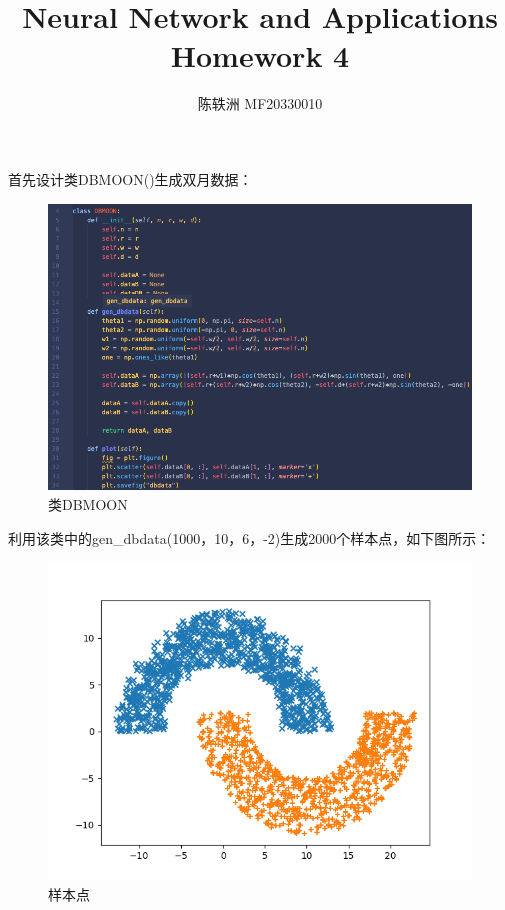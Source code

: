 \documentclass{article}
\title{Neural Network and Applications\\Homework 4}
\author{陈轶洲 MF20330010}
\begin{document}
	\maketitle
	
\section{}
首先设计类DBMOON()生成双月数据：
\begin{figure}[H]
	\centering
	\includegraphics[scale=0.5]{dbmoon.png}
	\caption{类DBMOON}
\end{figure}

利用该类中的gen\_dbdata(1000，10，6，-2)生成2000个样本点，如下图所示：
\begin{figure}[H]
	\centering
	\includegraphics[scale=0.6]{code/dbdata.png}
	\caption{样本点}
\end{figure}
\end{document}
